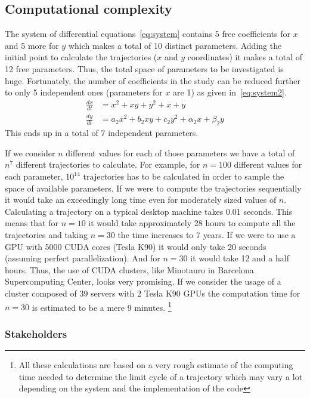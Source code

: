 \pagebreak

\subsection{Computational complexity}

The system of differential equations~\cref{eq:system} contains 5 free coefficients for $x$ and 5 more for $y$ which makes a total of 10 distinct parameters. Adding the initial point to calculate the trajectories ($x$ and $y$ coordinates) it makes a total of 12 free parameters. Thus, the total space of parameters to be investigated is huge. Fortunately, the number of coefficients in the study can be reduced further to only 5 independent ones (parameters for $x$ are 1) as given in~\cref{eq:system2}.
\begin{align}\label{eq:system2}
    \frac{dx}{dt} &= x^2 + xy + y^2 + x + y \nonumber \\
    \frac{dy}{dt} &= a_2x^2 + b_2xy + c_2y^2 + \alpha_2x + \beta_2y
\end{align}
This ends up in a total of 7 independent parameters.

If we consider $n$ different values for each of those parameters we have a total of $n^7$ different trajectories to calculate. For example, for $n=100$ different values for each parameter, $10^{14}$ trajectories has to be calculated in order to sample the space of available parameters. If we were to compute the trajectories sequentially it would take an exceedingly long time even for moderately sized values of $n$. Calculating a trajectory on a typical desktop machine takes 0.01 seconds. This means that for $n=10$ it would take approximately 28 hours to compute all the trajectories and taking $n=30$ the time increases to 7 years. If we were to use a GPU with 5000 CUDA cores (Tesla K90) it would only take 20 seconds (assuming perfect parallelization). And for $n=30$ it would take 12 and a half hours. Thus, the use of CUDA clusters, like Minotauro in Barcelona Supercomputing Center, looks very promising. If we consider the usage of a cluster composed of 39 servers with 2 Tesla K90 GPUs the computation time for $n=30$ is estimated to be a mere 9 minutes. \footnote{All these calculations are based on a very rough estimate of the computing time needed to determine the limit cycle of a trajectory which may vary a lot depending on the system and the implementation of the code}

\subsubsection{Stakeholders}

